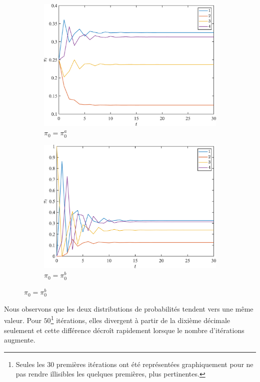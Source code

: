 \documentclass[a4paper, 12pt]{report}
\begin{document}
    \begin{figure}[H]
        \centering
        \begin{subfigure}{0.495\textwidth}
            \includegraphics[width=\textwidth]{resources/pdf/uniform.pdf}
            \caption{$\pi_0 = \pi_0^a$}
        \end{subfigure}
        \begin{subfigure}{0.495\textwidth}
            \includegraphics[width=\textwidth]{resources/pdf/determinist.pdf}
            \caption{$\pi_0 = \pi_0^b$}
        \end{subfigure}
        \label{fig:evolutions}
    \end{figure}
    Nous observons que les deux distributions de probabilités tendent vers une même valeur. Pour $\num{50}$\footnote{Seules les $30$ premières itérations ont été représentées graphiquement pour ne pas rendre illisibles les quelques premières, plus pertinentes.} itérations, elles divergent à partir de la dixième décimale seulement et cette différence décroît rapidement lorsque le nombre d'itérations augmente.
\end{document}
